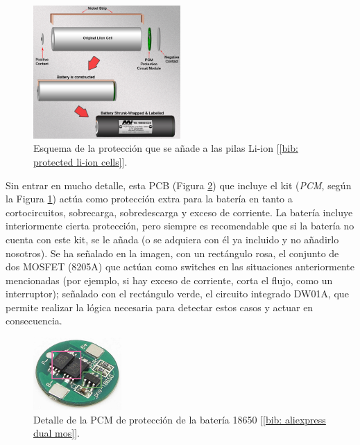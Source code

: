 \documentclass[12pt]{article}
\begin{document}
	\begin{figure}[h!]
		\begin{center}
			\includegraphics[width=0.5\textwidth]{img/construction_prot_circuit.png}
			\caption{Esquema de la protección que se añade a las pilas Li-ion [\ref{bib: protected li-ion cells}].}
			\label{Proteccion Li-Ion}
		\end{center}
	\end{figure}
	
	\pagebreak
	
	\noindent Sin entrar en mucho detalle, esta PCB (Figura \ref{PCB proteccion Li-Ion}) que incluye el kit (\textit{PCM}, según la Figura \ref{Proteccion Li-Ion})  actúa como protección extra para la batería en tanto a cortocircuitos, sobrecarga, sobredescarga y exceso de corriente. La batería incluye interiormente cierta protección, pero siempre es recomendable que si la batería no cuenta con este kit, se le añada (o se adquiera con él ya incluido y no añadirlo nosotros). Se ha señalado en la imagen, con un rectángulo rosa, el conjunto de dos MOSFET (8205A) que actúan como switches en las situaciones anteriormente mencionadas (por ejemplo, si hay exceso de corriente, corta el flujo, como un interruptor); señalado con el rectángulo verde, el circuito integrado DW01A, que permite realizar la lógica necesaria para detectar estos casos y actuar en consecuencia. 
	
	\begin{figure}[h!]
		\begin{center}
			\includegraphics[width=0.3\textwidth]{img/batt_prot_circuit_zoom_edited.png}
			\caption{Detalle de la PCM de protección de la batería 18650 [\ref{bib: aliexpress dual mos}].}
			\label{PCB proteccion Li-Ion}
		\end{center}
	\end{figure}
	
\end{document}
